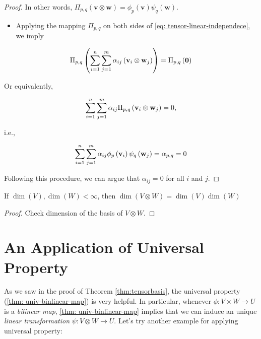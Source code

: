 \begin{proof}
In other words, \(\Pi_{p,q}\left( {\mathbf{v} \otimes  \mathbf{w}}\right)  = {\phi }_{p}\left( \mathbf{v}\right) {\psi }_{q}\left( \mathbf{w}\right)\).

\begin{itemize}
\item Applying the mapping \({\Pi }_{p,q}\) on both sides of \autoref{eq: tensor-linear-independece}, we imply
\end{itemize}

\[
{\Pi }_{p,q}\left( {\mathop{\sum }\limits_{{i = 1}}^n\mathop{\sum }\limits_{{j = 1}}^m\alpha_{ij}\left( {{\bf v}_{i} \otimes  {\bf w}_{j}}\right) }\right)  = {\Pi }_{p,q}\left( \mathbf{0}\right)
\]

Or equivalently,

\[
\mathop{\sum }\limits_{{i = 1}}^n\mathop{\sum }\limits_{{j = 1}}^m\alpha_{ij}{\Pi }_{p,q}\left( {{\bf v}_{i} \otimes  {\bf w}_{j}}\right)  = 0,
\]

i.e.,

\[
\mathop{\sum }\limits_{{i = 1}}^n\mathop{\sum }\limits_{{j = 1}}^m\alpha_{ij}{\phi }_{p}\left( {\bf v}_{i}\right) {\psi }_{q}\left( {\bf w}_{j}\right)  = \alpha_{p,q} = 0
\]

Following this procedure, we can argue that \(\alpha_{ij} = 0\) for all $i$ and \(j\).
\end{proof}

\begin{corollary} If \(\dim \left( V\right) ,\dim \left( W\right)  < \infty\), then \(\dim \left( {V \otimes  W}\right)  = \dim \left( V\right) \dim \left( W\right)\)
\end{corollary}

\begin{proof} Check dimension of the basis of \(V \otimes  W\).
\end{proof}

\section{An Application of Universal Property}
As we saw in the proof of Theorem \ref{thm:tensorbasis}, the universal property (\autoref{thm: univ-binlinear-map}) is very helpful. In particular, whenever \(\phi  : V \times  W \rightarrow  U\) is a {\it bilinear map}, \autoref{thm: univ-binlinear-map} implies that we can induce an unique {\it linear transformation} \(\psi  : V \otimes  W \rightarrow  U\). Let's try another example for applying universal property: 

